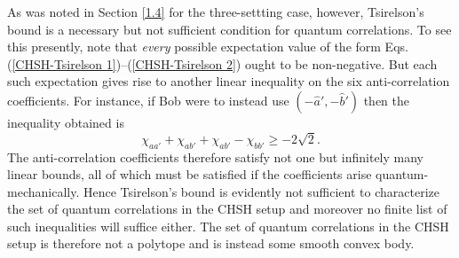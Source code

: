 As was noted in Section \ref{1.4} for the three-settting case, however, Tsirelson's bound is a necessary but not sufficient condition for quantum correlations. To see this presently, note that \emph{every} possible expectation value of the form Eqs. (\ref{CHSH-Tsirelson 1})--(\ref{CHSH-Tsirelson 2}) ought to be non-negative. But each such expectation gives rise to another linear inequality on the six anti-correlation coefficients. For instance, if Bob were to instead use $(-\hat{a}',-\hat{b}')$ then the inequality obtained is 
\begin{equation}
\chi_{aa'}+\chi_{ab'}+\chi_{ab'}-\chi_{bb'}\geq -2\sqrt{2}.
\label{CHSH-Tsirelson 6}
\end{equation}
The anti-correlation coefficients therefore satisfy not one but infinitely many linear bounds, all of which must be satisfied if the coefficients arise quantum-mechanically. Hence Tsirelson's bound is evidently not sufficient to characterize the set of quantum correlations in the CHSH setup and moreover no finite list of such inequalities will suffice either. The set of quantum correlations in the CHSH setup is therefore not a polytope and is instead some smooth convex body.

